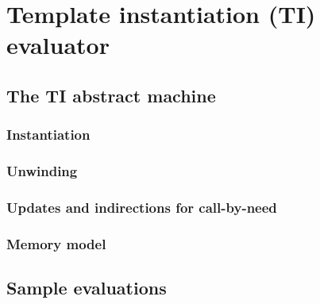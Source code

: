 \section{Template instantiation (TI) evaluator}
\label{sec:ti}


\subsection{The TI abstract machine}
\label{sec:ti-machine}


\subsubsection{Instantiation}
\label{sec:ti-instantiation}


\subsubsection{Unwinding}
\label{sec:ti-unwind}

\subsubsection{Updates and indirections for call-by-need}
\label{sec:ti-updates}

\subsubsection{Memory model}
\label{sec:ti-memory}

\subsection{Sample evaluations}
\label{sec:ti-examples}





